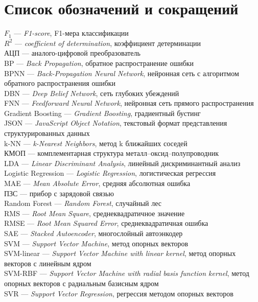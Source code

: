 \chapter*{Список обозначений и сокращений}

\noindent
\(F_1\) --- \textit{F1-score}, F1-мера классификации\\
\(R^2\) --- \textit{coefficient of determination}, коэффициент детерминации\\
АЦП --- аналого-цифровой преобразователь\\
BP --- \textit{Back Propagation}, обратное распространение ошибки\\
BPNN --- \textit{Back-Propagation Neural Network}, нейронная сеть с алгоритмом обратного распространения ошибки\\
DBN --- \textit{Deep Belief Network}, сеть глубоких убеждений\\
FNN --- \textit{Feedforward Neural Network}, нейронная сеть прямого распространения\\
Gradient Boosting --- \textit{Gradient Boosting}, градиентный бустинг\\
JSON --- \textit{JavaScript Object Notation}, текстовый формат представления структурированных данных\\
k-NN --- \textit{k-Nearest Neighbors}, метод k ближайших соседей\\
КМОП --- комплементарная структура металл--оксид--полупроводник\\
LDA --- \textit{Linear Discriminant Analysis}, линейный дискриминантный анализ\\
Logistic Regression --- \textit{Logistic Regression}, логистическая регрессия\\
MAE --- \textit{Mean Absolute Error}, средняя абсолютная ошибка\\
ПЗС --- прибор с зарядовой связью\\
Random Forest --- \textit{Random Forest}, случайный лес\\
RMS --- \textit{Root Mean Square}, среднеквадратичное значение\\
RMSE --- \textit{Root Mean Squared Error}, среднеквадратичная ошибка\\
SAE --- \textit{Stacked Autoencoder}, многослойный автоэнкодер\\
SVM --- \textit{Support Vector Machine}, метод опорных векторов\\
SVM-linear --- \textit{Support Vector Machine with linear kernel}, метод опорных векторов с линейным ядром\\
SVM-RBF --- \textit{Support Vector Machine with radial basis function kernel}, метод опорных векторов с радиальным базисным ядром\\
SVR --- \textit{Support Vector Regression}, регрессия методом опорных векторов\\
\endinput